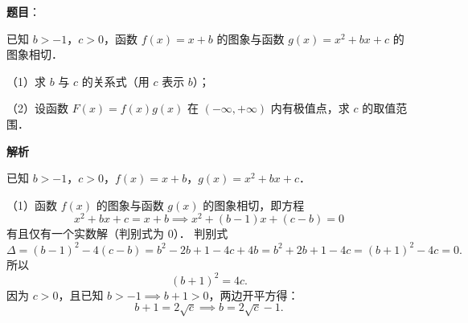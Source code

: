 \begin{answer}

\textbf{题目}：

已知 $b > -1$，$c > 0$，函数 $f(x) = x + b$ 的图象与函数 $g(x) = x^2 + bx + c$ 的图象相切．

（1）求 $b$ 与 $c$ 的关系式（用 $c$ 表示 $b$）；

（2）设函数 $F(x) = f(x)g(x)$ 在 $(-\infty, +\infty)$ 内有极值点，求 $c$ 的取值范围．

\textbf{解析}
\nopagebreak[4]
\begin{center}\end{center}
\nopagebreak[4]
已知 $b > -1$，$c > 0$，$f(x) = x + b$，$g(x) = x^2 + bx + c$．

（1）函数 $f(x)$ 的图象与函数 $g(x)$ 的图象相切，即方程
\nopagebreak[4]
\[
x^2 + bx + c = x + b \implies x^2 + (b - 1)x + (c - b) = 0
\]
有且仅有一个实数解（判别式为 $0$）．
判别式
\nopagebreak[4]
\[
\Delta = (b - 1)^2 - 4(c - b) = b^2 - 2b + 1 - 4c + 4b = b^2 + 2b + 1 - 4c = (b + 1)^2 - 4c = 0.
\]
所以
\nopagebreak[4]
\[
(b + 1)^2 = 4c.
\]
因为 $c > 0$，且已知 $b > -1 \implies b + 1 > 0$，两边开平方得：
\nopagebreak[4]
\[
b + 1 = 2\sqrt{c} \implies b = 2\sqrt{c} - 1.
\]


\end{answer}
